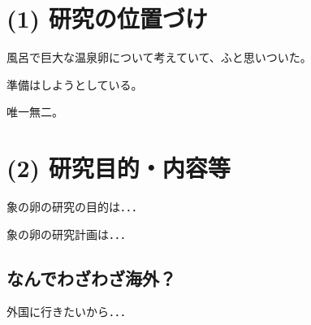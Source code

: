 \documentclass[11pt,a4j,dvipdfmx]{jarticle} 					%
\newcommand{\研究課題名}{象の卵}
\newcommand{\研究機関名}{逢坂大学}
\newcommand{\研究代表者氏名}{湯川秀樹}
\begin{document}

\section{(1) 研究の位置づけ}

		風呂で巨大な温泉卵について考えていて、ふと思いついた。

	準備はしようとしている。

	唯一無二。




\section{(2) 研究目的・内容等}

	象の卵の研究の目的は．．．	

	象の卵の研究計画は．．．

\subsection{なんでわざわざ海外？}
	外国に行きたいから．．．

 



\end{document}
